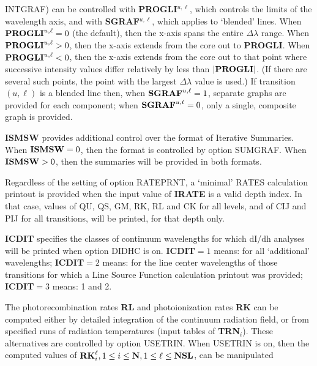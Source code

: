 INTGRAF) can be controlled with {\bf PROGLI}$^{u,\ell}$, which
controls the limits of the wavelength axis, and with {\bf SGRAF}$^{u,\ell}$,
which applies to `blended' lines. \np
When ${\bf PROGLI}^{u,\ell} = 0$ (the default), then the x-axis spans
the entire $\Delta\lambda$ range. \np
When ${\bf PROGLI}^{u,\ell} > 0$, then the x-axis extends from the 
core out to {\bf PROGLI}. \np
When ${\bf PROGLI}^{u,\ell} < 0$, then the x-axis extends from the core out
to that point where successive intensity values differ relatively
by less than $|{\bf PROGLI}|$. \break (If there are several such points,
the point with the largest $\Delta\lambda$ value is used.) \np
If transition $(u,\ell)$ is a blended line then, \np
when ${\bf SGRAF}^{u,\ell} = 1$, separate graphs are provided for each
component; \np
when ${\bf SGRAF}^{u,\ell} = 0$, only a single, composite graph is provided.
\ej
\centerline{}
\space \noindent
{\bf ISMSW} provides additional control over the format of Iterative
Summaries. \np
When ${\bf ISMSW} = 0$, then the format is controlled by option SUMGRAF. \np
When ${\bf ISMSW} > 0$, then the summaries will be provided in both formats.
\blankline
\blankline
\centerline{}
\space \noindent
Regardless of the setting of option RATEPRNT, a `minimal' RATES
calculation printout is provided when the input value of {\bf IRATE}
is a valid depth index. In that case, values of QU, QS, GM, RK, RL
and CK for all levels, and of CIJ and PIJ for all transitions,
will be printed, for that depth only.
\blankline
\blankline
\centerline{}
\space \noindent
{\bf ICDIT} specifies the classes of continuum wavelengths for which
dI/dh analyses will be printed when option DIDHC is on. \np
{\bf ICDIT}$ = 1$ means: for all `additional' wavelengths; \np
{\bf ICDIT}$ = 2$ means: for the line center wavelengths of those
transitions for which a Line Source Function calculation printout
was provided; \np
{\bf ICDIT}$ = 3$ means: 1 and 2.
\blankline
\blankline
\centerline{}
\space \noindent
The photorecombination rates {\bf RL} and photoionization rates
{\bf RK} can be computed either by detailed integration of the
continuum radiation field, or from specified runs of radiation
temperatures (input tables of {\bf TRN}$_i$). These alternatives
are controlled by option USETRIN. \np
When USETRIN is on, then the computed values of ${\bf RK}^\ell_i,
1 \leq i \leq {\bf N}, 1 \leq \ell \leq {\bf NSL}$, can be manipulated
